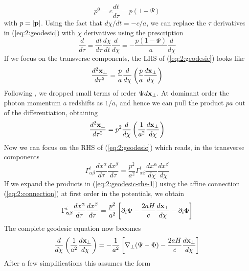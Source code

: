 \begin{equation}
\label{eq:2:nullconstr}
p^0 = c\frac{dt}{d\tau} = p(1-\Psi)
\end{equation} 
%
with $p=\vert\mathbf{p}\vert$. Using the fact that $d\chi/dt = -c/a$, we can replace the $\tau$ derivatives in (\ref{eq:2:geodesic}) with $\chi$ derivatives using the prescription
\begin{equation}
\label{eq:2:tau2chi}
\frac{d}{d\tau} = \frac{dt}{d\tau}\frac{d\chi}{dt}\frac{d}{d\chi} = -\frac{p(1-\Psi)}{a}\frac{d}{d\chi}
\end{equation}
%
If we focus on the transverse components, the LHS of (\ref{eq:2:geodesic}) looks like
\begin{equation}
\label{eq:2:geodesic-lhs-1}
\frac{d^2\mathbf{x}_\perp}{d\tau^2} = \frac{p}{a}\frac{d}{d\chi}\left(\frac{p}{a}\frac{d\mathbf{x}_\perp}{d\chi}\right)
\end{equation}
%
Following \citep{Dodelson-C11}, we dropped small terms of order $\Psi d\mathbf{x}_\perp$. At dominant order the photon momentum $a$ redshifts as $1/a$, and hence we can pull the product $pa$ out of the differentiation, obtaining 
\begin{equation}
\label{eq:2:geodesic-lhs-2}
\frac{d^2\mathbf{x}_\perp}{d\tau^2} = p^2\frac{d}{d\chi}\left(\frac{1}{a^2}\frac{d\mathbf{x}_\perp}{d\chi}\right)
\end{equation}
%
Now we can focus on the RHS of (\ref{eq:2:geodesic}) which reads, in the transverse components
\begin{equation}
\label{eq:2:geodesic-rhs-1}
\Gamma_{\alpha\beta}^i \frac{d x^\alpha}{d\tau}\frac{d x^\beta}{d\tau} = \frac{p^2}{a^2} \Gamma_{\alpha\beta}^i \frac{d x^\alpha}{d\chi}\frac{d x^\beta}{d\chi}
\end{equation}
%
If we expand the products in (\ref{eq:2:geodesic-rhs-1}) using the affine connection (\ref{eq:2:connection}) at first order in the potentials, we obtain
\begin{equation}
\label{eq:2:geodesic-rhs-2}
\Gamma_{\alpha\beta}^i \frac{d x^\alpha}{d\tau}\frac{d x^\beta}{d\tau} = \frac{p^2}{a^2}\left[\partial_i\Psi-\frac{2aH}{c}\frac{d\mathbf{x}_\perp}{d\chi} -\partial_i\Phi \right]
\end{equation}
%
The complete geodesic equation now becomes 
\begin{equation}
\label{eq:2:geodesic-fo-1}
\frac{d}{d\chi}\left(\frac{1}{a^2}\frac{d\mathbf{x}_\perp}{d\chi}\right) = -\frac{1}{a^2}\left[\nabla_\perp(\Psi-\Phi)-\frac{2aH}{c}\frac{d\mathbf{x}_\perp}{d\chi}\right]
\end{equation}
%
After a few simplifications this assumes the form 

